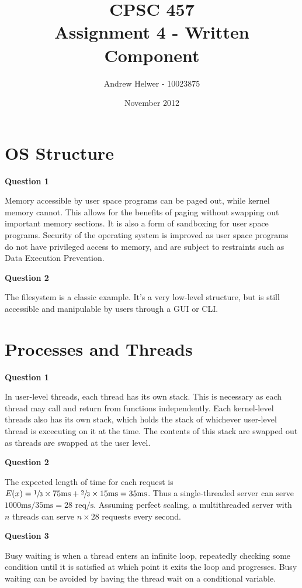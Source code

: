 \documentclass[letterpaper]{article}
\begin{document}
\title{CPSC 457 \\ Assignment 4 - Written Component}
\author{Andrew Helwer - 10023875}
\date{November 2012}
\maketitle

\section{OS Structure}

\textbf{Question 1}

Memory accessible by user space programs can be paged out, while kernel memory cannot.
This allows for the benefits of paging without swapping out important memory sections.
It is also a form of sandboxing for user space programs.
Security of the operating system is improved as user space programs do not have privileged access to memory, and are subject to restraints such as Data Execution Prevention.


\textbf{Question 2}

The filesystem is a classic example. 
It's a very low-level structure, but is still accessible and manipulable by users through a GUI or CLI.

\section{Processes and Threads}

\textbf{Question 1}

In user-level threads, each thread has its own stack.
This is necessary as each thread may call and return from functions independently.
Each kernel-level threads also has its own stack, which holds the stack of whichever user-level thread is excecuting on it at the time.
The contents of this stack are swapped out as threads are swapped at the user level.

\textbf{Question 2}

The expected length of time for each request is $E(x) = \sfrac{1}{3} \times 75 \text{ms} + \sfrac{2}{3} \times 15 \text{ms} = 35 \text{ms}$.
Thus a single-threaded server can serve $1000 \text{ms} / 35 \text{ms} = 28 \text{ req/s}$.
Assuming perfect scaling, a multithreaded server with $n$ threads can serve $n \times 28$ requests every second.

\textbf{Question 3}

Busy waiting is when a thread enters an infinite loop, repeatedly checking some condition until it is satisfied at which point it exits the loop and progresses.
Busy waiting can be avoided by having the thread wait on a conditional variable.
\end{document}

